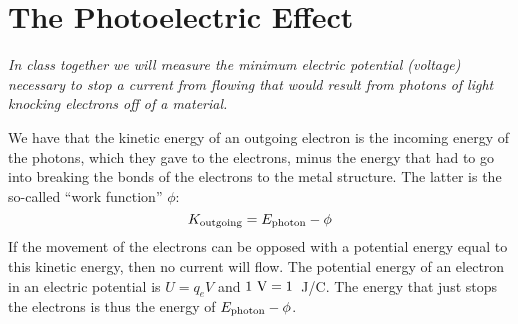 \section{The Photoelectric Effect}

\makelabheader %

\bigskip

\textit{In class together we will measure the minimum electric potential (voltage) necessary to stop a current from flowing that would result from photons of light knocking electrons off of a material.}

We have that the kinetic energy of an outgoing electron is the incoming energy of the photons, which they gave to the electrons, minus the energy that had to go into breaking the bonds of the electrons to the metal structure.  The latter is the so-called ``work function'' $\phi$:
$$K_{\rm outgoing} = E_{\rm photon} - \phi$$
If the movement of the electrons can be opposed with a potential energy equal to this kinetic energy, then no current will flow.  The potential energy of an electron in an electric potential is $U=q_e V$ and $1~{\rm V}=1$~J/C.  The energy that just stops the electrons is thus the energy of $E_{\rm photon} - \phi$.  

